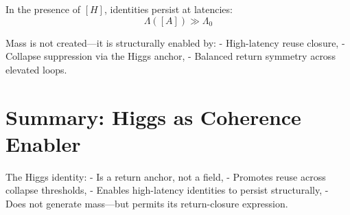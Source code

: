In the presence of $[H]$, identities persist at latencies:
\[
\Lambda([A]) \gg \Lambda_0
\]

Mass is not created—it is structurally enabled by:
- High-latency reuse closure,
- Collapse suppression via the Higgs anchor,
- Balanced return symmetry across elevated loops.

\section{Summary: Higgs as Coherence Enabler} \label{sec:higgs-summary}

The Higgs identity:
- Is a return anchor, not a field,
- Promotes reuse across collapse thresholds,
- Enables high-latency identities to persist structurally,
- Does not generate mass—but permits its return-closure expression.

